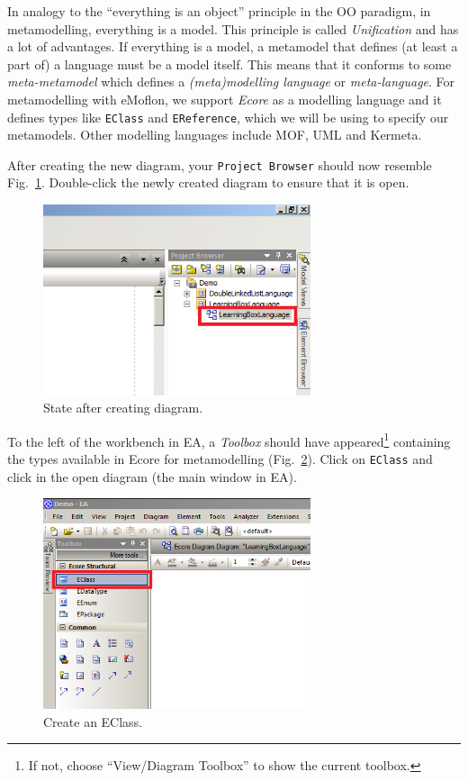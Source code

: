 In analogy to the ``everything is an object''
principle in the OO paradigm, in metamodelling, everything is a model.
This principle is called \emph{Unification} and has a lot of advantages.
If everything is a model, a metamodel that defines (at least a part of) a
language must be a model itself.
This means that it conforms to some \emph{meta-metamodel} which defines a
\emph{(meta)modelling language} or \emph{meta-language}.
For metamodelling with eMoflon, we support \emph{Ecore} as a modelling language
and it defines types like \texttt{EClass} and \texttt{EReference}, which we will
be using to specify  our metamodels.
Other modelling languages include MOF, UML and Kermeta. 


After creating the new diagram, your  \texttt{Project Browser} should now
resemble Fig.~\ref{fig:diagram_completed}.  Double-click the newly
created diagram to ensure that it is open.

\begin{figure}[htbp]
	\centering
  \includegraphics[width=0.7\textwidth]{pics/memBoxBilder/memBox06.png}
	\caption{State after creating diagram.}
	\label{fig:diagram_completed}
\end{figure}

To the left of the workbench in EA, a \emph{Toolbox} should have appeared\footnote{If not, choose ``View/Diagram Toolbox'' to show the current toolbox.}
containing the types available in Ecore for metamodelling
(Fig.~\ref{fig:eclass}).  Click on \texttt{EClass} and click in the open
diagram (the main window in EA).

\begin{figure}[htbp]
	\centering
  \includegraphics[width=0.7\textwidth]{pics/memBoxBilder/memBox07.png}
	\caption{Create an EClass.}
	\label{fig:eclass}
\end{figure}


